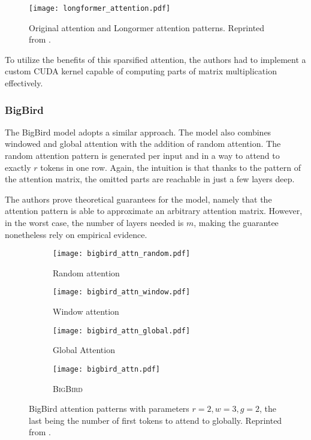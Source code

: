 \begin{figure}[!htb]
        \centering
        \texttt{[image: longformer\_attention.pdf]}
        \caption[Longformer Attention Patterns]{Original attention and Longormer attention patterns. Reprinted from \citep{longformer}.}
        \label{fig:longformer_attention}
\end{figure}

To utilize the benefits of this sparsified attention, the authors had to implement a custom CUDA kernel capable of computing parts of matrix multiplication effectively.

\subsubsection{BigBird}

The BigBird model \citep{bigbird} adopts a similar approach.
The model also combines windowed and global attention with the addition of random attention.
The random attention pattern is generated per input and in a way to attend to exactly $r$ tokens in one row. Again, the intuition is that thanks to the pattern of the attention matrix, the omitted parts are reachable in just a few layers deep.

The authors prove theoretical guarantees for the model, namely that the attention pattern is able to approximate an arbitrary attention matrix.
However, in the worst case, the number of layers needed is $m$, making the guarantee nonetheless rely on empirical evidence.

\begin{figure}[!htb]
        \centering
        \begin{subfigure}{.22\textwidth}
                \texttt{[image: bigbird\_attn\_random.pdf]}
                \caption{Random attention}
                \label{fig:rnd_atn}
            \end{subfigure}\hfill
            \begin{subfigure}{.22\textwidth}
                \texttt{[image: bigbird\_attn\_window.pdf]}
                \caption{Window attention}
                \label{fig:wnd:atn}
            \end{subfigure}\hfill
            \begin{subfigure}{.22\textwidth}
                \texttt{[image: bigbird\_attn\_global.pdf]}
                \caption{Global Attention}
                \label{fig:gbl_atn}
            \end{subfigure}\hfill
            \begin{subfigure}{.22\textwidth}
                \texttt{[image: bigbird\_attn.pdf]}
                \caption{\textsc{BigBird}}
                \label{fig:bigb_atn}
            \end{subfigure}
        \caption[BigBird Attention Patterns]{BigBird attention patterns with parameters $r=2, w=3, g=2$, the last being the number of first tokens to attend to globally. Reprinted from \citep{bigbird}.}
        \label{fig:bigbird_attention}
\end{figure}


